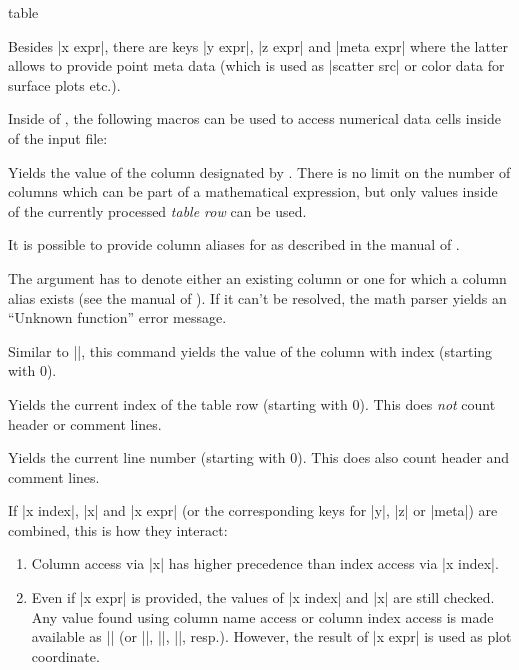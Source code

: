 {\begin{addplotoperation}[]{table}{}
\begin{codeexample}[vbox]
\end{codeexample}

	Besides |x expr|, there are keys |y expr|, |z expr| and |meta expr| where the latter allows to provide point meta data (which is used as |scatter src| or color data for surface plots etc.).

	Inside of , the following macros can be used to access numerical data cells inside of the input file:

	\begin{command}{\thisrow{}}
		Yields the value of the column designated by . There is no limit on the number of columns which can be part of a mathematical expression, but only values inside of the currently processed \emph{table row} can be used.
		
		It is possible to provide column aliases for  as described in the manual of \PGFPlotstable. 

		The argument  has to denote either an existing column or one for which a column alias exists (see the manual of \PGFPlotstable). If it can't be resolved, the math parser yields an ``Unknown function'' error message.
	\end{command}
	\begin{command}{\thisrowno{}}
		Similar to |\thisrow|, this command yields the value of the column with index  (starting with $0$). 
	\end{command}
	\begin{command}{\coordindex}
		Yields the current index of the table row (starting with $0$). This does \emph{not} count header or comment lines.		
	\end{command}
	\begin{command}{\lineno}
		Yields the current line number (starting with $0$). This does also count header and comment lines.
	\end{command}

	If |x index|, |x| and |x expr| (or the corresponding keys for |y|, |z| or |meta|) are combined, this is how they interact:
	\begin{enumerate}
		\item Column access via |x| has higher precedence than index access via |x index|.
		\item Even if |x expr| is provided, the values of |x index| and |x| are still checked. Any value found using column name access or column index access is made available as |\columnx| (or |\columny|, |\columnz|, |\columnmeta|, resp.). However, the result of |x expr| is used as plot coordinate.


\end{enumerate}
\end{addplotoperation}}
